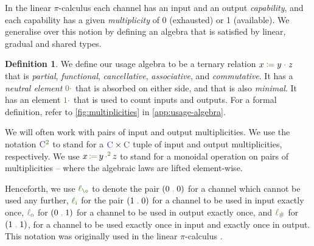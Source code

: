 \documentclass[a4paper,UKenglish,cleveref,autoref,thm-restate,authorcolumns]{lipics-v2019}
\theoremstyle{definition}
\newtheorem{nidefinition}[theorem]{Definition}
\newcommand{\picalc}{$\pi$-calculus}
\newcommand{\type}[1]{\textcolor{BlueViolet}{\operatorname{#1}}}
\newcommand{\constr}[1]{\textcolor{BurntOrange}{\operatorname{#1}}}
\newcommand{\func}[1]{\textcolor{OliveGreen}{\operatorname{#1}}}
\newcommand{\comma}{\; \constr{,} \;}
\newcommand{\op}[3]{#1 \; \func{\coloneqq} \; #2 \; \func{\cdot} \; #3}
\newcommand{\opsquared}[3]{#1 \, \func{\coloneqq} \, #2 \, \func{\cdot^2} \, #3}
\newcommand{\zero}{\func{0\cdot}}
\newcommand{\one}{\func{1\cdot}}
\newcommand{\li}{\func{\ell_i}}
\newcommand{\lo}{\func{\ell_o}}
\newcommand{\lz}{\func{\ell_{\o}}}
\newcommand{\lio}{\func{\ell_{\#}}}
\begin{document}
In the linear \picalc{} each channel has an input and an output \emph{capability}, and each capability has a given \emph{multiplicity} of 0 (exhausted) or 1 (available).
We generalise over this notion by defining an algebra that is satisfied by linear, gradual and shared types.

\begin{nidefinition}
  We define our usage algebra to be a ternary relation $\op{x}{y}{z}$ that is \emph{partial}, \emph{functional}, \emph{cancellative}, \emph{associative}, and \emph{commutative}.
  It has a \emph{neutral element} $\zero$ that is absorbed on either side, and that is also \emph{minimal}.
  It has an element $\one$ that is used to count inputs and outputs.
  For a formal definition, refer to \autoref{fig:multiplicities} in \autoref{app:usage-algebra}.
\end{nidefinition}

\begin{note}
  \label{note:linearity}
  We will often work with pairs of input and output multiplicities.
  We use the notation $\type{C}^{\func{2}}$ to stand for a $\type{C} \times \type{C}$ tuple of input and output multiplicities, respectively.
  We use $\opsquared{x}{y}{z}$ to stand for a monoidal operation on pairs of multiplicities -- where the algebraic laws are lifted element-wise.

  Henceforth, we use $\lz$ to denote the pair $(0 \comma 0)$ for a channel which cannot be used any further, $\li$ for the pair $(1 \comma 0)$ for a channel to be used in input exactly once, $\lo$ for $(0 \comma 1)$ for a channel to be used in output exactly once, and $\lio$ for $(1 \comma 1)$, for a channel to be used exactly once in input and exactly once in output.
  This notation was originally used in the linear \picalc{} \cite{KPT96,Sangio01}.
\end{note}
\end{document}
